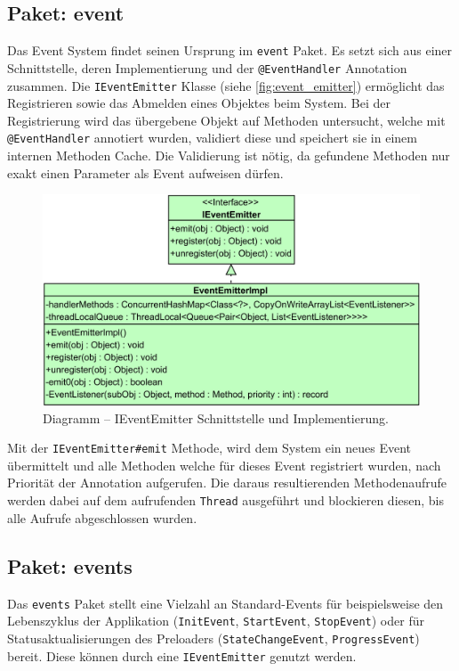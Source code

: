 \subsection{Paket: event}
Das Event System findet seinen Ursprung im \texttt{event} Paket. Es setzt sich aus einer Schnittstelle, deren Implementierung und der \texttt{@EventHandler} Annotation zusammen. Die \texttt{IEventEmitter} Klasse (siehe \autoref{fig:event_emitter}) ermöglicht das Registrieren sowie das Abmelden eines Objektes beim System. Bei der Registrierung wird das übergebene Objekt auf Methoden untersucht, welche mit \texttt{@EventHandler} annotiert wurden, validiert diese und speichert sie in einem internen Methoden Cache. Die Validierung ist nötig, da gefundene Methoden nur exakt einen Parameter als Event aufweisen dürfen. 
\begin{figure}[H]
	\centering
	\includegraphics[width=\textwidth-4cm]{Abbildungen/EventEmitter.png}
	\caption{Diagramm -- IEventEmitter Schnittstelle und Implementierung.}
	\label{fig:event_emitter}
\end{figure}
\noindent Mit der \texttt{IEventEmitter\#emit} Methode, wird dem System ein neues Event übermittelt und alle Methoden welche für dieses Event registriert wurden, nach Priorität der Annotation aufgerufen. Die daraus resultierenden Methodenaufrufe werden dabei auf dem aufrufenden \texttt{Thread} ausgeführt und blockieren diesen, bis alle Aufrufe abgeschlossen wurden.
\subsection{Paket: events}
Das \texttt{events} Paket stellt eine Vielzahl an Standard-Events für beispielsweise den Lebenszyklus der Applikation (\texttt{InitEvent}, \texttt{StartEvent}, \texttt{StopEvent}) oder für Statusaktualisierungen des Preloaders (\texttt{StateChangeEvent}, \texttt{ProgressEvent}) bereit. Diese können durch eine \texttt{IEventEmitter} genutzt werden.
